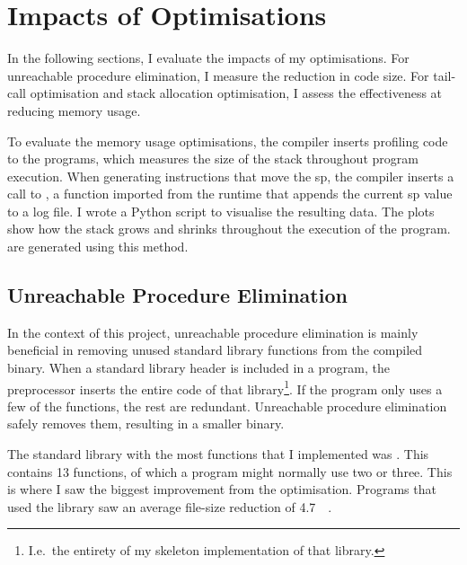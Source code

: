 \documentclass[00-main.tex]{subfiles}
\begin{document}
\section{Impacts of Optimisations}\label{sec:eval:optimisations}

In the following sections, I evaluate the impacts of my optimisations.
For unreachable procedure elimination, I measure the reduction in code size.
For tail-call optimisation and stack allocation optimisation, I assess the effectiveness at reducing memory usage.

To evaluate the memory usage optimisations, the compiler inserts profiling code to the programs, which measures the size of the stack throughout program execution.
When generating instructions that move the \acrlong{sp}, the compiler inserts a call to , a function imported from the runtime that appends the current \acrlong{sp} value to a log file.
I wrote a Python script to visualise the resulting data.
The plots show how the stack grows and shrinks throughout the execution of the program.
 are generated using this method.

\subsection{Unreachable Procedure Elimination}\label{sec:eval:unreachable procedure elimination}

In the context of this project, unreachable procedure elimination is mainly beneficial in removing unused standard library functions from the compiled binary.
When a standard library header is included in a program, the preprocessor inserts the entire code of that library\footnote{I.e.~the entirety of my skeleton implementation of that library.}.
If the program only uses a few of the functions, the rest are redundant.
Unreachable procedure elimination safely removes them, resulting in a smaller binary.


The standard library with the most functions that I implemented was .
This contains 13 functions, of which a program might normally use two or three.
This is where I saw the biggest improvement from the optimisation.
Programs that used the  library saw an average file-size reduction of \SI{4.7}{\kilo\byte}.
\end{document}
